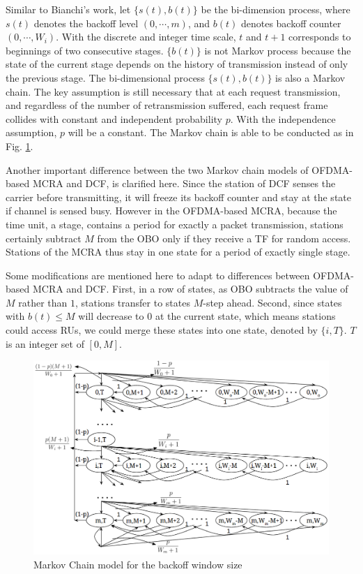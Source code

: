 \documentclass[journal]{IEEEtran}
\begin{document}
Similar to Bianchi's work, let $\lbrace s(t), b(t) \rbrace$ be the bi-dimension process, where $s(t)$ denotes the backoff level $(0,\cdots, m)$, and $b(t)$ denotes backoff counter $(0,\cdots, W_i)$.
With the discrete and integer time scale, $t$ and $t+1$ corresponds to beginnings of two consecutive stages.
$\lbrace b(t) \rbrace$ is not Markov process because the state of the current stage depends on the history of transmission instead of only the previous stage. 
The bi-dimensional process $\lbrace s(t),b(t) \rbrace$ is also a Markov chain.
The key assumption is still necessary that at each request transmission, and regardless of the number of retransmission suffered, each request frame collides with constant and independent probability $p$.
With the independence assumption, $p$ will be a constant. The Markov chain is able to be conducted as in Fig. \ref{Markov}.

Another important difference between the two Markov chain models of OFDMA-based MCRA and DCF, is clarified here.
Since the station of DCF senses the carrier before transmitting, it will freeze its backoff counter and stay at the state if channel is sensed busy. 
However in the OFDMA-based MCRA, because the time unit, a stage, contains a period for exactly a packet transmission, stations certainly subtract $M$ from the OBO only if they receive a TF for random access. 
Stations of the MCRA thus stay in one state for a period of exactly single stage.

Some modifications are mentioned here to adapt to differences between OFDMA-based MCRA and DCF. 
First, in a row of states, as OBO subtracts the value of $M$ rather than $1$, stations transfer to states $M$-step ahead.
Second, since states with $b(t)\leq M $ will decrease to $0$ at the current state, which means stations could access RUs, we could merge these states into one state, denoted by $\lbrace i, T \rbrace$. $T$ is an integer set of $[0,M]$. 

\begin{figure}[!t]
\includegraphics[scale=.45]{./figure/Markov_chain.png}
\caption{Markov Chain model for the backoff window size}
\label{Markov}
\end{figure}
\end{document}
